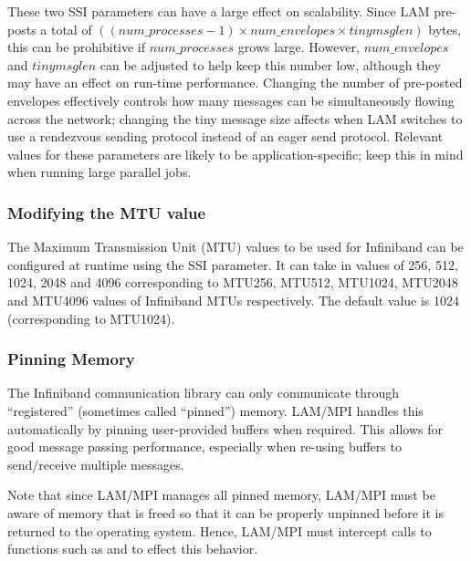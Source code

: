 
These two SSI parameters can have a large effect on scalability.
Since LAM pre-posts a total of $((num\_processes - 1) \times
num\_envelopes \times tinymsglen)$ bytes, this can be prohibitive if
$num\_processes$ grows large.  However, $num\_envelopes$ and
$tinymsglen$ can be adjusted to help keep this number low, although
they may have an effect on run-time performance.  Changing the number
of pre-posted envelopes effectively controls how many messages can be
simultaneously flowing across the network; changing the tiny message
size affects when LAM switches to use a rendezvous sending protocol
instead of an eager send protocol.  Relevant values for these
parameters are likely to be application-specific; keep this in mind
when running large parallel jobs.



\subsubsection{Modifying the MTU value}
\label{sec:mpi-ssi-ib-mtu}


The Maximum Transmission Unit (MTU) values to be used for Infiniband
can be configured at runtime using the
 SSI parameter. It can take in
values of 256, 512, 1024, 2048 and 4096 corresponding to MTU256,
MTU512, MTU1024, MTU2048 and MTU4096 values of Infiniband MTUs
respectively. The default value is 1024 (corresponding to MTU1024).



\subsubsection{Pinning Memory}
\label{sec:mpi-ssi-ib-ptmalloc}

The Infiniband communication library can only communicate through
``registered'' (sometimes called ``pinned'') memory.  LAM/MPI handles
this automatically by pinning user-provided buffers when required.
This allows for good message passing performance, especially when
re-using buffers to send/receive multiple messages.

Note that since LAM/MPI manages all pinned memory, LAM/MPI must be
aware of memory that is freed so that it can be properly unpinned
before it is returned to the operating system.  Hence, LAM/MPI must
intercept calls to functions such as  and 
to effect this behavior.


